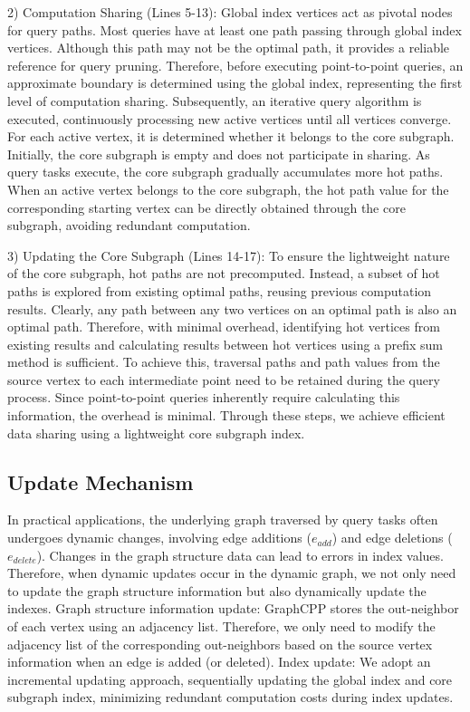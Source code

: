 \documentclass[lettersize,journal]{IEEEtran} %
\begin{document}
2) Computation Sharing (Lines 5-13): Global index vertices act as pivotal nodes for query paths. Most queries have at least one path passing through global index vertices. Although this path may not be the optimal path, it provides a reliable reference for query pruning. Therefore, before executing point-to-point queries, an approximate boundary is determined using the global index, representing the first level of computation sharing. Subsequently, an iterative query algorithm is executed, continuously processing new active vertices until all vertices converge. For each active vertex, it is determined whether it belongs to the core subgraph. Initially, the core subgraph is empty and does not participate in sharing. As query tasks execute, the core subgraph gradually accumulates more hot paths. When an active vertex belongs to the core subgraph, the hot path value for the corresponding starting vertex can be directly obtained through the core subgraph, avoiding redundant computation.

3) Updating the Core Subgraph (Lines 14-17): To ensure the lightweight nature of the core subgraph, hot paths are not precomputed. Instead, a subset of hot paths is explored from existing optimal paths, reusing previous computation results. Clearly, any path between any two vertices on an optimal path is also an optimal path. Therefore, with minimal overhead, identifying hot vertices from existing results and calculating results between hot vertices using a prefix sum method is sufficient. To achieve this, traversal paths and path values from the source vertex to each intermediate point need to be retained during the query process. Since point-to-point queries inherently require calculating this information, the overhead is minimal. Through these steps, we achieve efficient data sharing using a lightweight core subgraph index.

\subsection{Update Mechanism}
In practical applications, the underlying graph traversed by query tasks often undergoes dynamic changes, involving edge additions (${e_{add}}$) and edge deletions (${e_{delete}}$). Changes in the graph structure data can lead to errors in index values. Therefore, when dynamic updates occur in the dynamic graph, we not only need to update the graph structure information but also dynamically update the indexes. Graph structure information update: GraphCPP stores the out-neighbor of each vertex using an adjacency list. Therefore, we only need to modify the adjacency list of the corresponding out-neighbors based on the source vertex information when an edge is added (or deleted). Index update: We adopt an incremental updating approach, sequentially updating the global index and core subgraph index, minimizing redundant computation costs during index updates.
\end{document}
